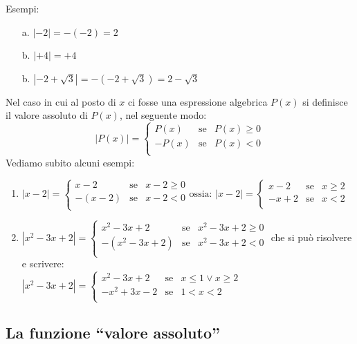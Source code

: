 Esempi:
\begin{enumerate}
\item[a.]
\(|-2|=-(-2)=2\)
\item[b.]
\(|+4|=+4\)
\item[b.]
\(|-2+\sqrt{3}|=-(-2+\sqrt{3})=2-\sqrt{3}\)
\end{enumerate} 
Nel caso in cui al posto di \(x\) ci fosse una espressione algebrica  \(P(x)\) si 
definisce il valore assoluto di \(P(x)\), nel seguente modo:
\[|P(x)|=\left\lbrace 
\begin{array}{lcl}
P(x) & \text{se} & P(x)\geq 0 \\
-P(x) & \text{se} & P(x)< 0 \\
\end{array}
\right. 
\]
Vediamo subito alcuni esempi:
\begin{enumerate}
\item
\(|x-2|=\left\lbrace 
\begin{array}{lcl}
x-2 & \text{se} & x-2\geq 0 \\
-(x-2) & \text{se} & x-2< 0 \\
\end{array}
\right.
\text{ossia: }
|x-2|=\left\lbrace 
\begin{array}{lcl}
x-2 & \text{se} & x\geq 2 \\
-x+2 & \text{se} & x<2 \\
\end{array}
\right.
\)
\item
\(|x^2-3x+2|=\left\lbrace 
\begin{array}{lcl}
x^2-3x+2 & \text{se} & x^2-3x+2\geq 0 \\
-(x^2-3x+2) & \text{se} & x^2-3x+2< 0 \\
\end{array}
\right.\)
che si può risolvere e scrivere:\\[0.2cm]
\(
|x^2-3x+2|=\left\lbrace 
\begin{array}{lcl}
x^2-3x+2 & \text{se} & x\leq 1 \vee x\geq 2 \\
-x^2+3x-2 & \text{se} & 1<x<2 \\
\end{array}
\right.
\)
\end{enumerate}

\subsection{La funzione ``valore assoluto''}

